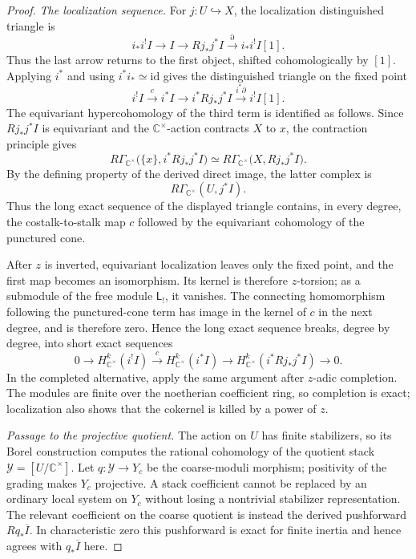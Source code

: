 \documentclass[11pt]{amsart}
\theoremstyle{definition}
\theoremstyle{remark}
\begin{document}
\begin{proof}
\smallskip
\noindent\emph{The localization sequence.}
For $j:U\hookrightarrow X$, the localization distinguished triangle is
\[
 i_*i^!I\longrightarrow I
 \longrightarrow Rj_*j^*I
 \xrightarrow{\partial}i_*i^!I[1].
\]
Thus the last arrow returns to the first object, shifted cohomologically by
$[1]$.  Applying $i^*$ and using $i^*i_*\simeq\mathrm{id}$ gives the
distinguished triangle on the fixed point
\[
 i^!I\xrightarrow{c}i^*I\longrightarrow i^*Rj_*j^*I
 \xrightarrow{i^*\partial}i^!I[1].
\]
The equivariant hypercohomology of the third term is identified as follows.  Since
$Rj_*j^*I$ is equivariant and the $\mathbb C^\times$-action contracts $X$ to
$x$, the contraction principle gives
\[
 R\Gamma_{\mathbb C^\times}
   \bigl(\{x\},i^*Rj_*j^*I\bigr)
 \simeq
 R\Gamma_{\mathbb C^\times}
   \bigl(X,Rj_*j^*I\bigr).
\]
By the defining property of the derived direct image, the latter complex is
\[
 R\Gamma_{\mathbb C^\times}(U,j^*I).
\]
Thus the long exact sequence of the displayed triangle contains, in every
degree, the costalk-to-stalk map $c$ followed by the equivariant cohomology
of the punctured cone.

After $z$ is inverted, equivariant localization
\cite[Theorem~6.2(2)]{GKM} leaves only the fixed
point, and the first map becomes an
isomorphism.  Its kernel is therefore $z$-torsion; as a submodule of the free
module $\mathsf L_!$, it vanishes.  The connecting homomorphism following the
punctured-cone term has image in the kernel of $c$ in the next degree, and is
therefore zero.  Hence the long exact sequence breaks, degree by degree, into
short exact sequences
\[
 0\longrightarrow H^k_{\mathbb C^\times}(i^!I)
 \xrightarrow{c}H^k_{\mathbb C^\times}(i^*I)
 \longrightarrow H^k_{\mathbb C^\times}(i^*Rj_*j^*I)
 \longrightarrow0.
\]
In the completed alternative, apply the same argument after $z$-adic
completion.  The modules are finite over the noetherian coefficient ring, so
completion is exact; localization also shows that the cokernel is killed by
a power of $z$.

\smallskip
\noindent\emph{Passage to the projective quotient.}
The action on $U$ has finite stabilizers, so its Borel construction computes
the rational cohomology of the quotient stack
$\mathcal Y=[U/\mathbb C^\times]$.  Let
$q:\mathcal Y\to Y_c$ be the coarse-moduli morphism; positivity of the
grading makes $Y_c$ projective.  A stack coefficient cannot be replaced by an
ordinary local system on $Y_c$ without losing a nontrivial stabilizer
representation.  The relevant coefficient on the coarse quotient is instead
the derived pushforward $Rq_*\overline I$.  In characteristic zero this pushforward is
exact for finite inertia and hence agrees with $q_*\overline I$ here.


\end{proof}
\end{document}
